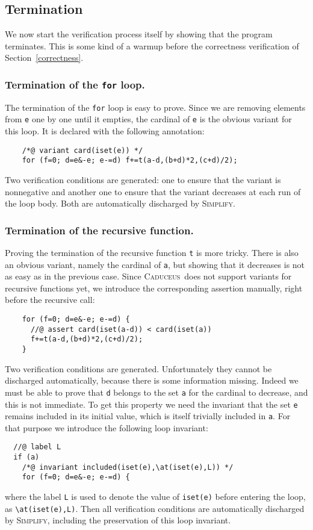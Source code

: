 \documentclass[a4paper]{llncs}
\newcommand{\caduceus}{\textsc{Caduceus}}
\newcommand{\simplify}{\textsc{Simplify}}
\begin{document}
\subsection{Termination}

We now start the verification process itself by showing that the
program terminates. This is some kind of a warmup before the
correctness verification of Section~\ref{correctness}.

\subsubsection{Termination of the \texttt{for} loop.}
The termination of the \texttt{for} loop is easy to prove.
Since we are removing elements from \texttt{e} one by one until it
empties, the cardinal of \texttt{e} is the obvious variant for this
loop. It is declared with the following annotation:
\begin{verbatim}
    /*@ variant card(iset(e)) */
    for (f=0; d=e&-e; e-=d) f+=t(a-d,(b+d)*2,(c+d)/2);
\end{verbatim}
Two verification conditions are generated: one to ensure that the
variant is nonnegative and another one to ensure that the variant
decreases at each run of the loop body. Both are automatically
discharged by \simplify.

\subsubsection{Termination of the recursive function.}
Proving the termination of the recursive function \texttt{t} is more
tricky. There is also an obvious variant, namely the cardinal of
\texttt{a}, but showing that it decreases is not as easy as in the
previous case. Since \caduceus\ does not support variants for
recursive functions yet, we introduce the corresponding
assertion manually, right before the recursive call:
\begin{verbatim}
    for (f=0; d=e&-e; e-=d) {
      //@ assert card(iset(a-d)) < card(iset(a))
      f+=t(a-d,(b+d)*2,(c+d)/2); 
    }
\end{verbatim}
Two verification conditions are generated. 
Unfortunately they cannot be discharged automatically, because there
is some information missing. Indeed we must be able to prove that
\texttt{d} belongs to the set \texttt{a} for the cardinal to decrease,
and this is not immediate. To get this property we need the invariant
that the set \texttt{e} remains included in its initial value, which
is itself trivially included in \texttt{a}. For that purpose we
introduce the following loop invariant:
\begin{verbatim}
  //@ label L
  if (a)
    /*@ invariant included(iset(e),\at(iset(e),L)) */
    for (f=0; d=e&-e; e-=d) {
\end{verbatim}
where the label \texttt{L} is used to denote the value of
\verb!iset(e)! before entering the loop, as \verb!\at(iset(e),L)!.
Then all verification conditions are automatically discharged by
\simplify, including the preservation of this loop invariant.
\end{document}
